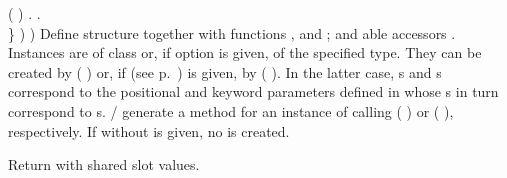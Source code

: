 \begin{LIST}{1cm}
{{{{{            ( )
          }{.}
        }{.}\\
      }{\}}%
      )%
    }
    )}
  {
    Define structure  together with functions
  ,  and
  ; and able accessors
  \LIT{-}. Instances are of class  or, if 
   option  is given, of the specified type.
  They can be
  created by ( ) or, if  (see
  p.\ \pageref{section:Functions}) is given, by (
   ). In the latter
  case, s and \kwd{:}s correspond to the positional
  and keyword parameters defined in  whose s
  in turn correspond to s.
  / generate a
   method for an instance  of 
  calling (  ) or (
    ), respectively.
  If  without  is given, no 
  is created.
}

  {
  Return  with shared slot values.
  }

\end{LIST}



